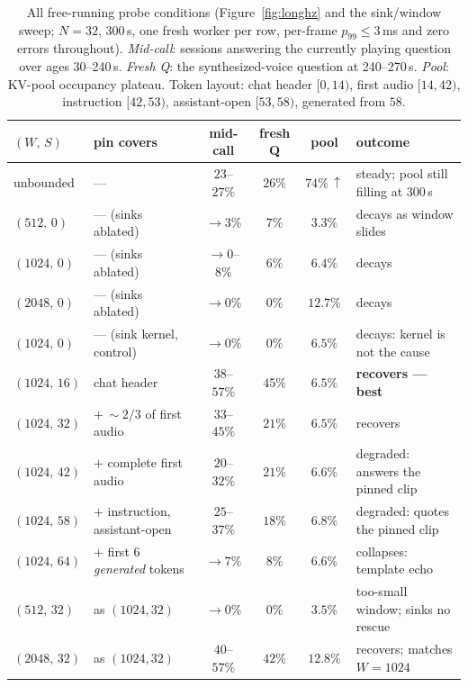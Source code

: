 \begin{table}[h]
\centering\small
\caption{All free-running probe conditions (Figure~\ref{fig:longhz} and the sink/window sweep;
$N{=}32$, 300\,s, one fresh worker per row, per-frame $p_{99}{\le}3$\,ms and zero errors throughout).
\emph{Mid-call}: sessions answering the currently playing question over ages 30--240\,s.
\emph{Fresh Q}: the synthesized-voice question at 240--270\,s. \emph{Pool}: KV-pool occupancy
plateau. Token layout: chat header $[0,14)$, first audio $[14,42)$, instruction $[42,53)$,
assistant-open $[53,58)$, generated from $58$.}
\label{tab:sinksweep}
\footnotesize
\setlength{\tabcolsep}{4pt}
\begin{tabular}{llcccl}
\toprule
$(W,\,S)$ & pin covers & mid-call & fresh Q & pool & outcome \\
\midrule
unbounded      & ---                              & $23$--$27\%$ & $26\%$ & $74\%\,\uparrow$ & steady; pool still filling at 300\,s \\
\midrule
$(512,\,0)$    & --- (sinks ablated)              & $\to 3\%$    & $7\%$  & $3.3\%$  & decays as window slides \\
$(1024,\,0)$   & --- (sinks ablated)              & $\to 0$--$8\%$ & $6\%$ & $6.4\%$  & decays \\
$(2048,\,0)$   & --- (sinks ablated)              & $\to 0\%$    & $0\%$  & $12.7\%$ & decays \\
$(1024,\,0)$   & --- (sink kernel, control)       & $\to 0\%$    & $0\%$  & $6.5\%$  & decays: kernel is not the cause \\
\midrule
$(1024,\,16)$  & chat header                      & $38$--$57\%$ & $45\%$ & $6.5\%$  & \textbf{recovers --- best} \\
$(1024,\,32)$  & $+\,{\sim}2/3$ of first audio    & $33$--$45\%$ & $21\%$ & $6.5\%$  & recovers \\
$(1024,\,42)$  & $+$ complete first audio         & $20$--$32\%$ & $21\%$ & $6.6\%$  & degraded: answers the pinned clip \\
$(1024,\,58)$  & $+$ instruction, assistant-open  & $25$--$37\%$ & $18\%$ & $6.8\%$  & degraded: quotes the pinned clip \\
$(1024,\,64)$  & $+$ first 6 \emph{generated} tokens & $\to 7\%$ & $8\%$  & $6.6\%$  & collapses: template echo \\
\midrule
$(512,\,32)$   & as $(1024,32)$                   & $\to 0\%$    & $0\%$  & $3.5\%$  & too-small window; sinks no rescue \\
$(2048,\,32)$  & as $(1024,32)$                   & $40$--$57\%$ & $42\%$ & $12.8\%$ & recovers; matches $W{=}1024$ \\
\bottomrule
\end{tabular}
\end{table}
